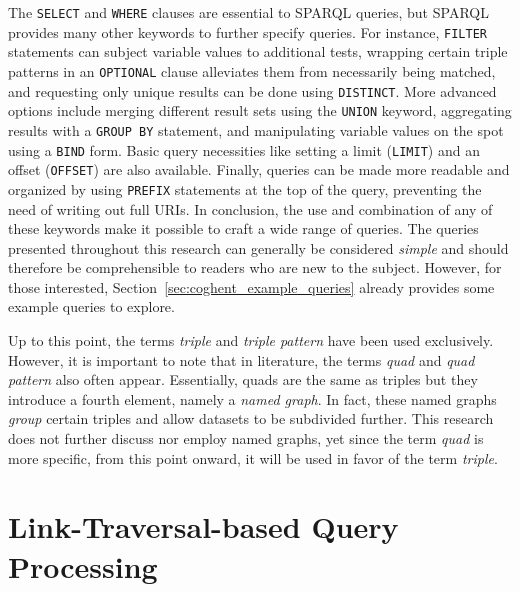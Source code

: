 The \texttt{SELECT} and \texttt{WHERE} clauses are essential to SPARQL queries, but SPARQL provides many other keywords to further specify queries. For instance, \texttt{FILTER} statements can subject variable values to additional tests, wrapping certain triple patterns in an \texttt{OPTIONAL} clause alleviates them from necessarily being matched, and requesting only unique results can be done using \texttt{DISTINCT}. More advanced options include merging different result sets using the \texttt{UNION} keyword, aggregating results with a \texttt{GROUP BY} statement, and manipulating variable values on the spot using a \texttt{BIND} form. Basic query necessities like setting a limit (\texttt{LIMIT}) and an offset (\texttt{OFFSET}) are also available. Finally, queries can be made more readable and organized by using \texttt{PREFIX} statements at the top of the query, preventing the need of writing out full URIs. In conclusion, the use and combination of any of these keywords make it possible to craft a wide range of queries. The queries presented throughout this research can generally be considered \textit{simple} and should therefore be comprehensible to readers who are new to the subject. However, for those interested, Section~\ref{sec:coghent_example_queries} already provides some example queries to explore. \citep{seaborn2013sparql} \citep{ducharme2013learning}

Up to this point, the terms \textit{triple} and \textit{triple pattern} have been used exclusively. However, it is important to note that in literature, the terms \textit{quad} and \textit{quad pattern} also often appear. Essentially, quads are the same as triples but they introduce a fourth element, namely a \textit{named graph}. In fact, these named graphs \textit{group} certain triples and allow datasets to be subdivided further. This research does not further discuss nor employ named graphs, yet since the term \textit{quad} is more specific, from this point onward, it will be used in favor of the term \textit{triple}. \citep{taelman2020quad}

\section{Link-Traversal-based Query Processing}
\label{sec:ltqp}

